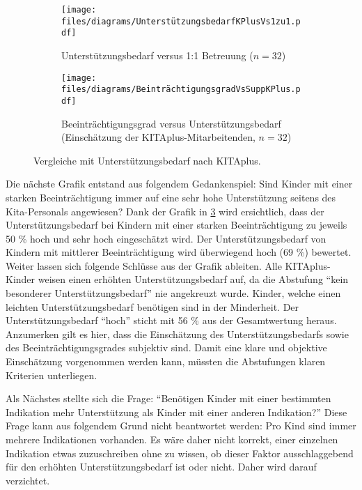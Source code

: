 \documentclass[
  ngerman,
  11pt,
  paper=a4,
  twoside,
  titlepage=true,
  openright,
  abstract=on,
  toc=listofnumbered,
  numbers=noenddot,
  chapterprefix=true,
  headings=optiontohead,
  svgnames,
  dvipsnames]{scrreprt}
\begin{document}
\begin{figure}
     \centering
     \begin{subfigure}[b]{0.49\textwidth}
         \centering
         \texttt{[image: files/diagrams/UnterstützungsbedarfKPlusVs1zu1.pdf]}
         \caption{Unterstützungsbedarf versus 1:1 Betreuung ($n=32$)}
         \label{fig:unterstuetzungsbedarfKPlusVs1zu1}
     \end{subfigure}
     \hfill
     \begin{subfigure}[b]{0.49\textwidth}
         \centering
         \texttt{[image: files/diagrams/BeinträchtigungsgradVsSuppKPlus.pdf]}
         \caption{Beeinträchtigungsgrad versus Unterstützungsbedarf (Einschätzung der KITAplus-Mitarbeitenden, $n=32$)}
         \label{fig:beeintraechtigungsgradVsSuppKPlus}
     \end{subfigure}
     \caption{Vergleiche mit Unterstützungsbedarf nach KITAplus.}
\end{figure}

Die nächste Grafik entstand aus folgendem Gedankenspiel: Sind Kinder mit
einer starken Beeinträchtigung immer auf eine sehr hohe Unterstützung
seitens des Kita-Personals angewiesen? Dank der Grafik in
\cref{fig:beeintraechtigungsgradVsSuppKPlus} wird ersichtlich, dass der
Unterstützungsbedarf bei Kindern mit einer starken Beeinträchtigung zu
jeweils 50 \% hoch und sehr hoch eingeschätzt wird. Der
Unterstützungsbedarf von Kindern mit mittlerer Beeinträchtigung wird
überwiegend hoch (69 \%) bewertet. Weiter lassen sich folgende Schlüsse
aus der Grafik ableiten. Alle KITAplus-Kinder weisen einen erhöhten
Unterstützungsbedarf auf, da die Abstufung “kein besonderer
Unterstützungsbedarf” nie angekreuzt wurde. Kinder, welche einen
leichten Unterstützungsbedarf benötigen sind in der Minderheit. Der
Unterstützungsbedarf “hoch” sticht mit 56 \% aus der Gesamtwertung
heraus. Anzumerken gilt es hier, dass die Einschätzung des
Unterstützungsbedarfs sowie des Beeinträchtigungsgrades subjektiv sind.
Damit eine klare und objektive Einschätzung vorgenommen werden kann,
müssten die Abstufungen klaren Kriterien unterliegen.

Als Nächstes stellte sich die Frage: “Benötigen Kinder mit einer
bestimmten Indikation mehr Unterstützung als Kinder mit einer anderen
Indikation?” Diese Frage kann aus folgendem Grund nicht beantwortet
werden: Pro Kind sind immer mehrere Indikationen vorhanden. Es wäre
daher nicht korrekt, einer einzelnen Indikation etwas zuzuschreiben ohne
zu wissen, ob dieser Faktor ausschlaggebend für den erhöhten
Unterstützungsbedarf ist oder nicht. Daher wird darauf verzichtet.
\end{document}
